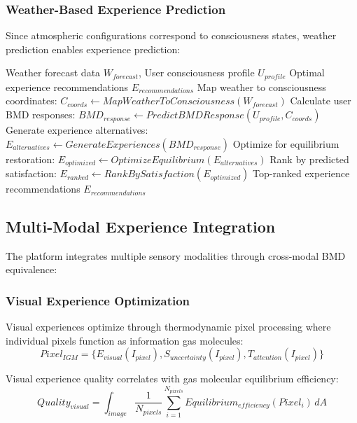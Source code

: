 \documentclass[12pt,a4paper]{article}
\begin{document}
\subsubsection{Weather-Based Experience Prediction}

Since atmospheric configurations correspond to consciousness states, weather prediction enables experience prediction:

\begin{algorithm}[H]
\caption{Weather-Based Experience Prediction}
\begin{algorithmic}[1]
\REQUIRE Weather forecast data $W_{forecast}$, User consciousness profile $U_{profile}$
\ENSURE Optimal experience recommendations $E_{recommendations}$
\STATE Map weather to consciousness coordinates: $C_{coords} \leftarrow MapWeatherToConsciousness(W_{forecast})$
\STATE Calculate user BMD responses: $BMD_{response} \leftarrow PredictBMDResponse(U_{profile}, C_{coords})$
\STATE Generate experience alternatives: $E_{alternatives} \leftarrow GenerateExperiences(BMD_{response})$
\STATE Optimize for equilibrium restoration: $E_{optimized} \leftarrow OptimizeEquilibrium(E_{alternatives})$
\STATE Rank by predicted satisfaction: $E_{ranked} \leftarrow RankBySatisfaction(E_{optimized})$
\RETURN Top-ranked experience recommendations $E_{recommendations}$
\end{algorithmic}
\end{algorithm}

\subsection{Multi-Modal Experience Integration}

The platform integrates multiple sensory modalities through cross-modal BMD equivalence:

\subsubsection{Visual Experience Optimization}

Visual experiences optimize through thermodynamic pixel processing where individual pixels function as information gas molecules:
\begin{equation}
Pixel_{IGM} = \{E_{visual}(I_{pixel}), S_{uncertainty}(I_{pixel}), T_{attention}(I_{pixel})\}
\end{equation}

Visual experience quality correlates with gas molecular equilibrium efficiency:
\begin{equation}
Quality_{visual} = \int_{image} \frac{1}{N_{pixels}} \sum_{i=1}^{N_{pixels}} Equilibrium_{efficiency}(Pixel_{i}) \, dA
\end{equation}
\end{document}
